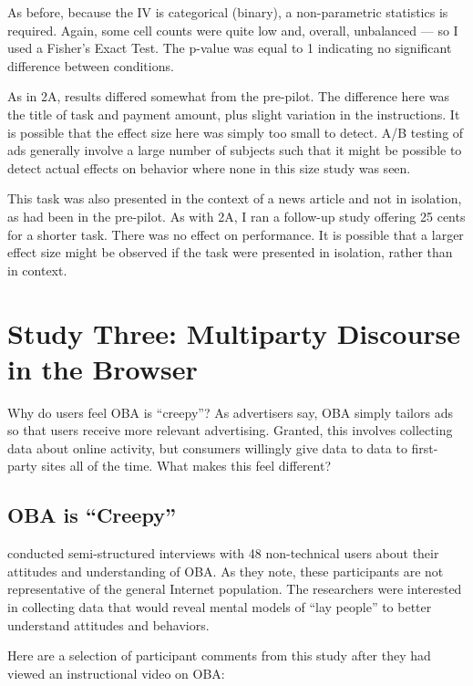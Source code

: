 As before, because the IV is categorical (binary), a non-parametric statistics is required. Again, some cell counts were quite low and, overall, unbalanced --- so I used a Fisher's Exact Test. The p-value was equal to 1 indicating no significant difference between conditions.

As in 2A, results differed somewhat from the pre-pilot. The difference here was the title of task and payment amount, plus slight variation in the instructions. It is possible that the effect size here was simply too small to detect. A\slash B testing of ads generally involve a large number of subjects such that it might be possible to detect actual effects on behavior where none in this size study was seen. 

This task was also presented in the context of a news article and not in isolation, as had been in the pre-pilot.    As with 2A, I ran a follow-up study offering 25 cents for a shorter task. There was no effect on performance. It is possible that a larger effect size might be observed if the task were presented in isolation, rather than in context.

\chapter{Study Three: Multiparty Discourse in the Browser}
\label{studythree:multipartydiscourseinthebrowser}

Why do users feel OBA is ``creepy''? As advertisers say, OBA simply tailors ads so that users receive more relevant advertising. Granted, this involves collecting data about online activity, but consumers willingly give data to data to first-party sites all of the time. What makes this feel different?

\section{OBA is ``Creepy''}
\label{obaiscreepy}

 \cite{Ur:2012ws}  conducted semi-structured interviews with 48 non-technical users about their attitudes and understanding of OBA. As they note, these participants are not representative of the general Internet population. The researchers were interested in collecting data that would reveal mental models of ``lay people'' to better understand attitudes and behaviors. 

Here are a selection of participant comments from this study after they had viewed an instructional video on OBA:


